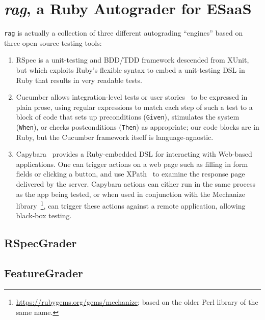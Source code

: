 \section{\emph{rag}, a Ruby Autograder for ESaaS}

\texttt{rag} is actually a collection of three different autograding
``engines'' based on three open source testing
tools:
\begin{enumerate}

\item RSpec is a unit-testing and
BDD/TDD framework descended from XUnit, but which exploits Ruby's
flexible syntax to embed a unit-testing DSL in Ruby that results in very
readable tests.  

\item Cucumber allows
integration-level tests or user stories~\cite{user-stories} to be
expressed in plain prose, using regular expressions to match each step
of such a test to a block of code that sets up preconditions (\texttt{Given}), stimulates
the system (\texttt{When}), or checks postconditions (\texttt{Then}) as
appropriate; our code blocks are in Ruby, but the Cucumber framework
itself is language-agnostic.  

\item Capybara~
provides a Ruby-embedded DSL for interacting with Web-based
applications.
One can trigger actions on a web page such as filling in form fields
or clicking a button, and use XPath~\cite{xpath} to examine the
response page delivered by the server.
Capybara actions can either run in the same process as the app being
tested, or when used in conjunction with the Mechanize
library~\footnote{\url{https://rubygems.org/gems/mechanize}; based on
  the older Perl library of the same name.}, can trigger these actions
against a remote application, allowing black-box testing.

\end{enumerate}

\subsection{RSpecGrader}


\subsection{FeatureGrader}


